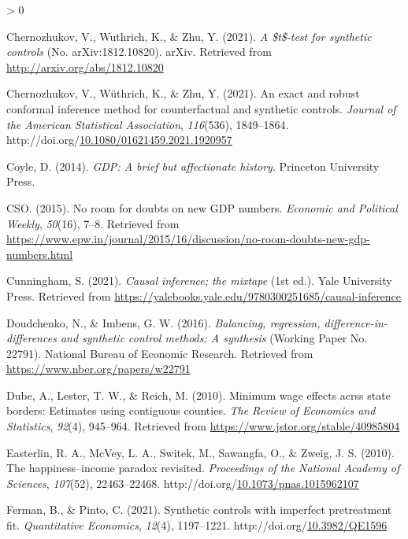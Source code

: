 \documentclass[12pt,nobind, a4paper]{reedthesis}
\newlength{\cslhangindent}
\newenvironment{CSLReferences}[2] %
{%
	\setlength{\parindent}{0pt}
	\ifodd #1 \everypar{\setlength{\hangindent}{\cslhangindent}}\ignorespaces\fi
	\ifnum #2 > 0
	\setlength{\parskip}{#2\baselineskip}
	\fi
}%
{}
\begin{document}
\begin{CSLReferences}{1}{0}
 \leavevmode\hypertarget{ref-chernozhukov_t-test_2021}{}%
 Chernozhukov, V., Wuthrich, K., \& Zhu, Y. (2021). \emph{A \$t\$-test for synthetic controls} (No. {arXiv}:1812.10820). {arXiv}. Retrieved from \url{http://arxiv.org/abs/1812.10820}

 \leavevmode\hypertarget{ref-chernozhukov_exact_2021}{}%
 Chernozhukov, V., Wüthrich, K., \& Zhu, Y. (2021). An exact and robust conformal inference method for counterfactual and synthetic controls. \emph{Journal of the American Statistical Association}, \emph{116}(536), 1849--1864. http://doi.org/\href{https://doi.org/10.1080/01621459.2021.1920957}{10.1080/01621459.2021.1920957}

 \leavevmode\hypertarget{ref-coyle_gdp_2014}{}%
 Coyle, D. (2014). \emph{{GDP}: A brief but affectionate history}. Princeton University Press.

 \leavevmode\hypertarget{ref-cso_no_2015}{}%
 CSO. (2015). No room for doubts on new {GDP} numbers. \emph{Economic and Political Weekly}, \emph{50}(16), 7--8. Retrieved from \url{https://www.epw.in/journal/2015/16/discussion/no-room-doubts-new-gdp-numbers.html}

 \leavevmode\hypertarget{ref-cunningham_causal_2021}{}%
 Cunningham, S. (2021). \emph{Causal inference; the mixtape} (1st ed.). Yale University Press. Retrieved from \url{https://yalebooks.yale.edu/9780300251685/causal-inference}

 \leavevmode\hypertarget{ref-doudchenko_balancing_2016}{}%
 Doudchenko, N., \& Imbens, G. W. (2016). \emph{Balancing, regression, difference-in-differences and synthetic control methods: A synthesis} (Working Paper No. 22791). National Bureau of Economic Research. Retrieved from \url{https://www.nber.org/papers/w22791}

 \leavevmode\hypertarget{ref-dube_minimum_2010}{}%
 Dube, A., Lester, T. W., \& Reich, M. (2010). Minimum wage effects acrss state borders: Estimates using contiguous counties. \emph{The Review of Economics and Statistics}, \emph{92}(4), 945--964. Retrieved from \url{https://www.jstor.org/stable/40985804}

 \leavevmode\hypertarget{ref-easterlin_happinessincome_2010}{}%
 Easterlin, R. A., McVey, L. A., Switek, M., Sawangfa, O., \& Zweig, J. S. (2010). The happiness--income paradox revisited. \emph{Proceedings of the National Academy of Sciences}, \emph{107}(52), 22463--22468. http://doi.org/\href{https://doi.org/10.1073/pnas.1015962107}{10.1073/pnas.1015962107}

 \leavevmode\hypertarget{ref-ferman_synthetic_2021}{}%
 Ferman, B., \& Pinto, C. (2021). Synthetic controls with imperfect pretreatment fit. \emph{Quantitative Economics}, \emph{12}(4), 1197--1221. http://doi.org/\href{https://doi.org/10.3982/QE1596}{10.3982/QE1596}


\end{CSLReferences}
\end{document}
